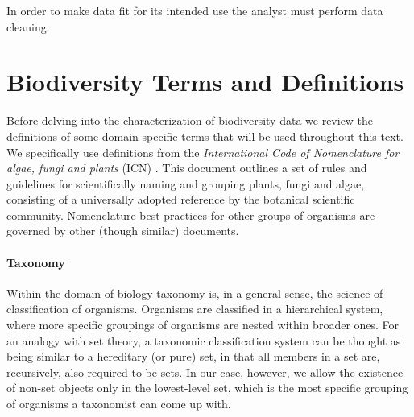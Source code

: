 
In order to make data fit for its intended use the analyst must perform data cleaning.










\section{Biodiversity Terms and Definitions}
Before delving into the characterization of biodiversity data we review the definitions of some domain-specific terms that will be used throughout this text. 
We specifically use definitions from the \textit{International Code of Nomenclature for algae, fungi and plants} (ICN) \cite{McNeill2012}. This document outlines a set of rules and guidelines for scientifically naming and grouping plants, fungi and algae, consisting of a universally adopted reference by the botanical scientific community. Nomenclature best-practices for other groups of organisms are governed by other (though similar) documents.

\paragraph*{Taxonomy}
Within the domain of biology taxonomy is, in a general sense, the science of classification of organisms. 
Organisms are classified in a hierarchical system, where more specific groupings of organisms are nested within broader ones. 
For an analogy with set theory, a taxonomic classification system can be thought as being similar to a hereditary (or pure) set, in that all members in a set are, recursively, also required to be sets. In our case, however, we allow the existence of non-set objects only in the lowest-level set, which is the most specific grouping of organisms a taxonomist can come up with.

